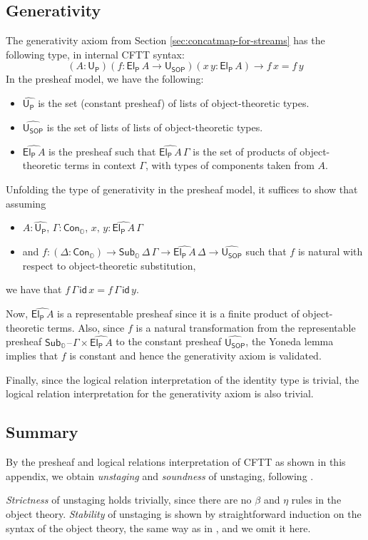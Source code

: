 \documentclass[acmsmall,screen]{acmart}
\newcommand{\mit}[1]{{\mathsf{#1}}}
\newcommand{\msf}[1]{{\mathsf{#1}}}
\newcommand{\mbb}[1]{\mathbb{#1}}
\newcommand{\U}{\mathsf{U}}
\newcommand{\wh}[1]{\widehat{#1}}
\newcommand{\Cono}{\msf{Con}_{\mbbo}}
\newcommand{\Subo}{\msf{Sub}_{\mbbo}}
\newcommand{\mbbo}{\mbb{O}}
\newcommand{\USOP}{\msf{U}_{\msf{SOP}}}
\newcommand{\Uprod}{\msf{U_P}}
\newcommand{\Elprod}{\msf{El_{P}}}
\newcommand{\blank}{{\mathord{\hspace{1pt}\text{--}\hspace{1pt}}}}
\theoremstyle{remark}
\newcommand{\id}{\mit{id}}
\begin{document}
\subsection{Generativity} \label{appendix:generativity}

The generativity axiom from Section \ref{sec:concatmap-for-streams} has the following type, in internal
CFTT syntax:
\[ (A : \U_\msf{P})(f : \Elprod\,A \to \USOP)(x\,y : \Elprod\,A) \to f\,x = f\,y  \]
In the presheaf model, we have the following:
\begin{itemize}
\item $\wh{\Uprod}$ is the set (constant presheaf) of lists of object-theoretic types.
\item $\wh{\USOP}$ is the set of lists of lists of object-theoretic types.
\item $\wh{\Elprod\,A}$ is the presheaf such that $\wh{\Elprod\,A}\,\Gamma$ is
  the set of products of object-theoretic terms in context $\Gamma$, with types
  of components taken from $A$.
\end{itemize}
Unfolding the type of generativity in the presheaf model, it suffices to show
that assuming
\begin{itemize}
\item $A : \wh{\Uprod}$, $\Gamma : \Cono$, $x,\,y : \wh{\Elprod\,A}\,\Gamma$
\item and $f : (\Delta : \Cono) \to \Subo\,\Delta\,\Gamma \to \wh{\Elprod\,A}\,\Delta \to \wh{\USOP}$ such that $f$ is natural with respect to object-theoretic substitution,
\end{itemize}
we have that $f\,\Gamma\,\id\,x = f\,\Gamma\,\id\,y$.

Now, $\wh{\Elprod\,A}$ is a representable presheaf since it is a finite product
of object-theoretic terms. Also, since $f$ is a natural transformation from the
representable presheaf $\Subo\blank\Gamma \times \wh{\Elprod\,A}$ to the
constant presheaf $\wh{\USOP}$, the Yoneda lemma implies that $f$ is constant and
hence the generativity axiom is validated.

Finally, since the logical relation interpretation of the identity type is trivial,
the logical relation interpretation for the generativity axiom is also trivial.

\subsection{Summary}

By the presheaf and logical relations interpretation of CFTT as shown in this appendix,
we obtain \emph{unstaging} and \emph{soundness} of unstaging, following \cite{staged2ltt}.

\emph{Strictness} of unstaging holds trivially, since there are no $\beta$ and
$\eta$ rules in the object theory. \emph{Stability} of unstaging is shown by
straightforward induction on the syntax of the object theory, the same way as in
\cite{staged2ltt}, and we omit it here.


\end{document}
